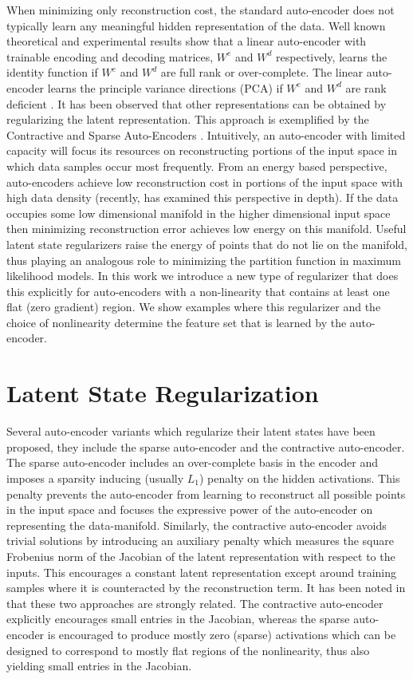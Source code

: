 \documentclass{article} %
\begin{document}
\noindent
When minimizing only reconstruction cost, the standard auto-encoder does not typically learn any meaningful hidden representation of the data. Well known theoretical and experimental results show that a linear auto-encoder with trainable encoding and decoding matrices, $W^e$ and $W^d$ respectively, learns the identity function if $W^e$ and $W^d$ are full rank or over-complete. The linear auto-encoder learns the principle variance directions (PCA) if $W^e$ and $W^d$ are rank deficient \cite{DHS}. It has been observed that other representations can be obtained by regularizing the latent representation. This approach is exemplified by the Contractive and Sparse Auto-Encoders \cite{CAE} \cite{SAE1} \cite{SAE2}. Intuitively, an auto-encoder with limited capacity will focus its resources on reconstructing portions of the input space in which data samples occur most frequently. From an energy based perspective, auto-encoders achieve low reconstruction cost in portions of the input space with high data density (recently, \cite{bengio_new} has examined this perspective in depth). If the data occupies some low dimensional manifold in the higher dimensional input space then minimizing reconstruction error achieves low energy on this manifold. Useful latent state regularizers raise the energy of points that do not lie on the manifold, thus playing an analogous role to minimizing the partition function in maximum likelihood models. In this work we introduce a new type of regularizer that does this explicitly for auto-encoders with a non-linearity that contains at least one flat (zero gradient) region. We show examples where this regularizer and the choice of nonlinearity determine the feature set that is learned by the auto-encoder.      

\section{Latent State Regularization}  
Several auto-encoder variants which regularize their latent states have been proposed, they include the sparse auto-encoder and the contractive auto-encoder\cite{SAE1}\cite{SAE2}\cite{CAE}. The sparse auto-encoder includes an over-complete basis in the encoder and imposes a sparsity inducing (usually $L_1$) penalty on the hidden activations. This penalty prevents the auto-encoder from learning to reconstruct all possible points in the input space and focuses the expressive power of the auto-encoder on representing the data-manifold. Similarly, the contractive auto-encoder avoids trivial solutions by introducing an auxiliary penalty which measures the square  Frobenius norm of the Jacobian of the latent representation with respect to the inputs. This encourages a constant latent representation except around training samples where it is counteracted by the reconstruction term. It has been noted in \cite{CAE} that these two approaches are strongly related. The contractive auto-encoder explicitly encourages small entries in the Jacobian, whereas the sparse auto-encoder is encouraged to produce mostly zero (sparse) activations which can be designed to correspond to mostly flat regions of the nonlinearity, thus also yielding small entries in the Jacobian.
\end{document}
